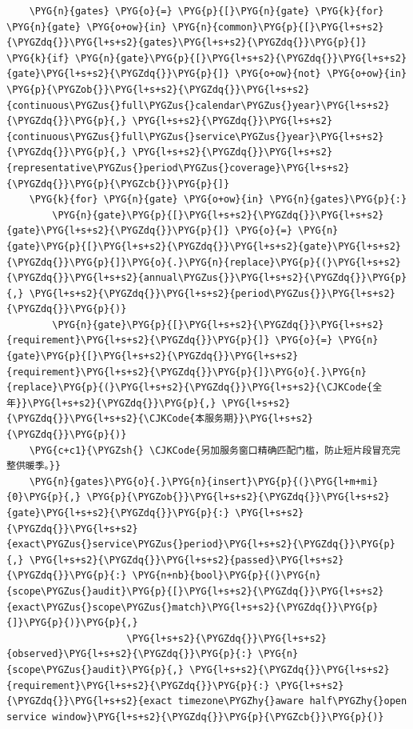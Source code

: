 \begin{Verbatim}
    \PYG{n}{gates} \PYG{o}{=} \PYG{p}{[}\PYG{n}{gate} \PYG{k}{for} \PYG{n}{gate} \PYG{o+ow}{in} \PYG{n}{common}\PYG{p}{[}\PYG{l+s+s2}{\PYGZdq{}}\PYG{l+s+s2}{gates}\PYG{l+s+s2}{\PYGZdq{}}\PYG{p}{]} \PYG{k}{if} \PYG{n}{gate}\PYG{p}{[}\PYG{l+s+s2}{\PYGZdq{}}\PYG{l+s+s2}{gate}\PYG{l+s+s2}{\PYGZdq{}}\PYG{p}{]} \PYG{o+ow}{not} \PYG{o+ow}{in} \PYG{p}{\PYGZob{}}\PYG{l+s+s2}{\PYGZdq{}}\PYG{l+s+s2}{continuous\PYGZus{}full\PYGZus{}calendar\PYGZus{}year}\PYG{l+s+s2}{\PYGZdq{}}\PYG{p}{,} \PYG{l+s+s2}{\PYGZdq{}}\PYG{l+s+s2}{continuous\PYGZus{}full\PYGZus{}service\PYGZus{}year}\PYG{l+s+s2}{\PYGZdq{}}\PYG{p}{,} \PYG{l+s+s2}{\PYGZdq{}}\PYG{l+s+s2}{representative\PYGZus{}period\PYGZus{}coverage}\PYG{l+s+s2}{\PYGZdq{}}\PYG{p}{\PYGZcb{}}\PYG{p}{]}
    \PYG{k}{for} \PYG{n}{gate} \PYG{o+ow}{in} \PYG{n}{gates}\PYG{p}{:}
        \PYG{n}{gate}\PYG{p}{[}\PYG{l+s+s2}{\PYGZdq{}}\PYG{l+s+s2}{gate}\PYG{l+s+s2}{\PYGZdq{}}\PYG{p}{]} \PYG{o}{=} \PYG{n}{gate}\PYG{p}{[}\PYG{l+s+s2}{\PYGZdq{}}\PYG{l+s+s2}{gate}\PYG{l+s+s2}{\PYGZdq{}}\PYG{p}{]}\PYG{o}{.}\PYG{n}{replace}\PYG{p}{(}\PYG{l+s+s2}{\PYGZdq{}}\PYG{l+s+s2}{annual\PYGZus{}}\PYG{l+s+s2}{\PYGZdq{}}\PYG{p}{,} \PYG{l+s+s2}{\PYGZdq{}}\PYG{l+s+s2}{period\PYGZus{}}\PYG{l+s+s2}{\PYGZdq{}}\PYG{p}{)}
        \PYG{n}{gate}\PYG{p}{[}\PYG{l+s+s2}{\PYGZdq{}}\PYG{l+s+s2}{requirement}\PYG{l+s+s2}{\PYGZdq{}}\PYG{p}{]} \PYG{o}{=} \PYG{n}{gate}\PYG{p}{[}\PYG{l+s+s2}{\PYGZdq{}}\PYG{l+s+s2}{requirement}\PYG{l+s+s2}{\PYGZdq{}}\PYG{p}{]}\PYG{o}{.}\PYG{n}{replace}\PYG{p}{(}\PYG{l+s+s2}{\PYGZdq{}}\PYG{l+s+s2}{\CJKCode{全年}}\PYG{l+s+s2}{\PYGZdq{}}\PYG{p}{,} \PYG{l+s+s2}{\PYGZdq{}}\PYG{l+s+s2}{\CJKCode{本服务期}}\PYG{l+s+s2}{\PYGZdq{}}\PYG{p}{)}
    \PYG{c+c1}{\PYGZsh{} \CJKCode{另加服务窗口精确匹配门槛，防止短片段冒充完整供暖季。}}
    \PYG{n}{gates}\PYG{o}{.}\PYG{n}{insert}\PYG{p}{(}\PYG{l+m+mi}{0}\PYG{p}{,} \PYG{p}{\PYGZob{}}\PYG{l+s+s2}{\PYGZdq{}}\PYG{l+s+s2}{gate}\PYG{l+s+s2}{\PYGZdq{}}\PYG{p}{:} \PYG{l+s+s2}{\PYGZdq{}}\PYG{l+s+s2}{exact\PYGZus{}service\PYGZus{}period}\PYG{l+s+s2}{\PYGZdq{}}\PYG{p}{,} \PYG{l+s+s2}{\PYGZdq{}}\PYG{l+s+s2}{passed}\PYG{l+s+s2}{\PYGZdq{}}\PYG{p}{:} \PYG{n+nb}{bool}\PYG{p}{(}\PYG{n}{scope\PYGZus{}audit}\PYG{p}{[}\PYG{l+s+s2}{\PYGZdq{}}\PYG{l+s+s2}{exact\PYGZus{}scope\PYGZus{}match}\PYG{l+s+s2}{\PYGZdq{}}\PYG{p}{]}\PYG{p}{)}\PYG{p}{,}
                     \PYG{l+s+s2}{\PYGZdq{}}\PYG{l+s+s2}{observed}\PYG{l+s+s2}{\PYGZdq{}}\PYG{p}{:} \PYG{n}{scope\PYGZus{}audit}\PYG{p}{,} \PYG{l+s+s2}{\PYGZdq{}}\PYG{l+s+s2}{requirement}\PYG{l+s+s2}{\PYGZdq{}}\PYG{p}{:} \PYG{l+s+s2}{\PYGZdq{}}\PYG{l+s+s2}{exact timezone\PYGZhy{}aware half\PYGZhy{}open service window}\PYG{l+s+s2}{\PYGZdq{}}\PYG{p}{\PYGZcb{}}\PYG{p}{)}

\end{Verbatim}
